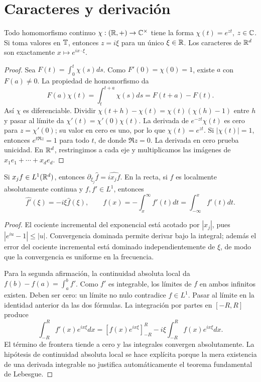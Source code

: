 \section{Caracteres y derivación}\label{lectura:v4-11}
\begin{proposicion}\label{v4:caracteres-R}
Todo homomorfismo continuo $\chi:(\mathbb R,+)\to\mathbb C^\times$ tiene la forma $\chi(t)=e^{zt}$, $z\in\mathbb C$. Si toma valores en $\mathbb T$, entonces $z=i\xi$ para un único $\xi\in\mathbb R$. Los caracteres de $\mathbb R^d$ son exactamente $x\mapsto e^{ix\cdot\xi}$.
\end{proposicion}
\begin{proof}
Sea $F(t)=\int_0^t\chi(s)ds$. Como $F'(0)=\chi(0)=1$, existe $a$ con $F(a)\ne0$. La propiedad de homomorfismo da
\[
 F(a)\chi(t)=\int_t^{t+a}\chi(s)ds=F(t+a)-F(t).
\]
Así $\chi$ es diferenciable. Dividir $\chi(t+h)-\chi(t)=\chi(t)(\chi(h)-1)$ entre $h$ y pasar al límite da $\chi'(t)=\chi'(0)\chi(t)$. La derivada de $e^{-zt}\chi(t)$ es cero para $z=\chi'(0)$; su valor en cero es uno, por lo que $\chi(t)=e^{zt}$. Si $|\chi(t)|=1$, entonces $e^{t\Re z}=1$ para todo $t$, de donde $\Re z=0$. La derivada en cero prueba unicidad. En $\mathbb R^d$, restringimos a cada eje y multiplicamos las imágenes de $x_1e_1+\cdots+x_de_d$.
\end{proof}
\begin{proposicion}\label{v4:derivacion-fourier}
Si $x_jf\in L^1(\mathbb R^d)$, entonces $\partial_{\xi_j}\widehat f=\widehat{ix_jf}$. En la recta, si $f$ es localmente absolutamente continua y $f,f'\in L^1$, entonces
\[
 \widehat{f'}(\xi)=-i\xi\widehat f(\xi),\qquad
 f(x)=-\int_x^\infty f'(t)dt=\int_{-\infty}^xf'(t)dt.
\]
\end{proposicion}
\begin{proof}
El cociente incremental del exponencial está acotado por $|x_j|$, pues $|e^{iu}-1|\leq|u|$. Convergencia dominada permite derivar bajo la integral; además el error del cociente incremental está dominado independientemente de $\xi$, de modo que la convergencia es uniforme en la frecuencia.

Para la segunda afirmación, la continuidad absoluta local da $f(b)-f(a)=\int_a^bf'$. Como $f'$ es integrable, los límites de $f$ en ambos infinitos existen. Deben ser cero: un límite no nulo contradice $f\in L^1$. Pasar al límite en la identidad anterior da las dos fórmulas. La integración por partes en $[-R,R]$ produce
\[
 \int_{-R}^Rf'(x)e^{ix\xi}dx
 =[f(x)e^{ix\xi}]_{-R}^R-i\xi\int_{-R}^Rf(x)e^{ix\xi}dx.
\]
El término de frontera tiende a cero y las integrales convergen absolutamente. La hipótesis de continuidad absoluta local se hace explícita porque la mera existencia de una derivada integrable no justifica automáticamente el teorema fundamental de Lebesgue.
\end{proof}

